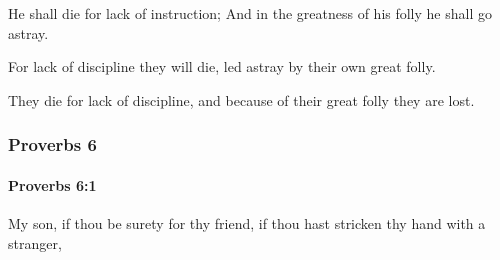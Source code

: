 			\begin{versebox}
					\item[BHS] 
					\item[ASV] He shall die for lack of instruction; And in the greatness of his folly he shall go astray.
					\item[NIV] For lack of discipline they will die, led astray by their own great folly.
					\item[NRSV] They die for lack of discipline, and because of their great folly they are lost.
			\end{versebox}
	\subsubsection{Proverbs 6} %
		\label{PROVERBS-6}

		\paragraph{Proverbs 6:1} %
			\label{PROVERBS-6-1}

			My son, if thou be surety for thy friend, if thou hast stricken thy hand with a stranger,

